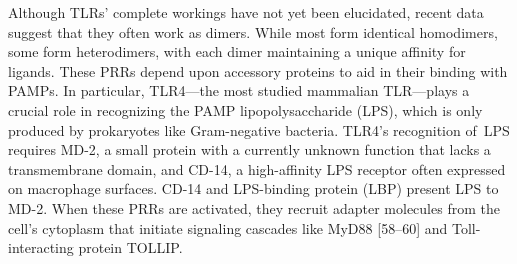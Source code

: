 Although TLRs' complete workings have not yet been elucidated, recent
data suggest that they often work as dimers. While most form identical
homodimers, some form heterodimers, with each dimer maintaining a unique
affinity for ligands. These PRRs depend upon accessory proteins to aid
in their binding with PAMPs. In particular, TLR4---the most studied
mammalian TLR---plays a crucial role in recognizing the PAMP
lipopolysaccharide (LPS), which is only produced by prokaryotes like
Gram-negative bacteria. TLR4's recognition of~LPS requires MD-2, a small
protein with a currently unknown function that lacks a transmembrane
domain, and CD-14, a high-affinity LPS receptor often expressed on
macrophage surfaces. CD-14 and LPS-binding protein (LBP) present LPS to
MD-2. When these PRRs are activated, they recruit adapter molecules from
the cell's cytoplasm that initiate signaling cascades like MyD88
{[}58--60{]} and Toll-interacting protein TOLLIP.
\newpage